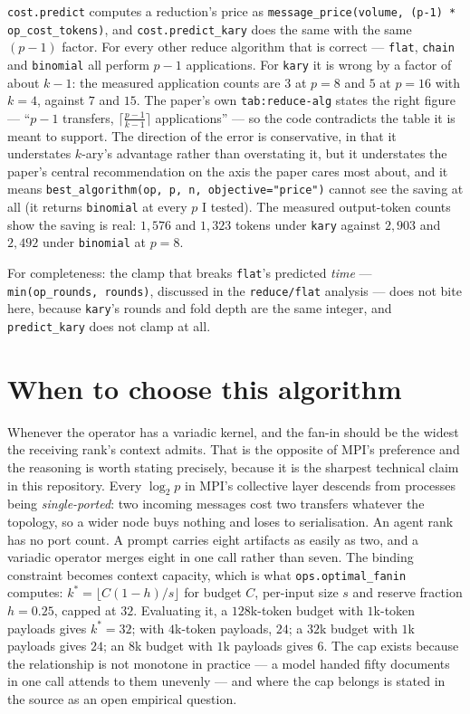 \documentclass[11pt]{article}
\begin{document}
\texttt{cost.predict} computes a reduction's price as
\texttt{message\_price(volume, (p-1) * op\_cost\_tokens)}, and \texttt{cost.predict\_kary} does
the same with the same $(p-1)$ factor. For every other reduce algorithm that is correct ---
\texttt{flat}, \texttt{chain} and \texttt{binomial} all perform $p-1$ applications. For
\texttt{kary} it is wrong by a factor of about $k-1$: the measured application counts are $3$
at $p=8$ and $5$ at $p=16$ with $k=4$, against $7$ and $15$. The paper's own
\texttt{tab:reduce-alg} states the right figure --- ``$p-1$ transfers,
$\lceil\frac{p-1}{k-1}\rceil$ applications'' --- so the code contradicts the table it is meant
to support. The direction of the error is conservative, in that it understates $k$-ary's
advantage rather than overstating it, but it understates the paper's central recommendation on
the axis the paper cares most about, and it means \texttt{best\_algorithm(op, p, n,
objective="price")} cannot see the saving at all (it returns \texttt{binomial} at every $p$ I
tested). The measured output-token counts show the saving is real: $1{,}576$ and $1{,}323$
tokens under \texttt{kary} against $2{,}903$ and $2{,}492$ under \texttt{binomial} at $p=8$.

For completeness: the clamp that breaks \texttt{flat}'s predicted \emph{time} ---
\texttt{min(op\_rounds, rounds)}, discussed in the \texttt{reduce/flat} analysis --- does not
bite here, because \texttt{kary}'s rounds and fold depth are the same integer, and
\texttt{predict\_kary} does not clamp at all.

\section{When to choose this algorithm}

Whenever the operator has a variadic kernel, and the fan-in should be the widest the receiving
rank's context admits. That is the opposite of MPI's preference and the reasoning is worth
stating precisely, because it is the sharpest technical claim in this repository. Every
$\log_2 p$ in MPI's collective layer descends from processes being \emph{single-ported}: two
incoming messages cost two transfers whatever the topology, so a wider node buys nothing and
loses to serialisation. An agent rank has no port count. A prompt carries eight artifacts as
easily as two, and a variadic operator merges eight in one call rather than seven. The binding
constraint becomes context capacity, which is what \texttt{ops.optimal\_fanin} computes:
$k^{*} = \lfloor C(1-h)/s \rfloor$ for budget $C$, per-input size $s$ and reserve fraction
$h = 0.25$, capped at $32$. Evaluating it, a $128$k-token budget with $1$k-token payloads gives
$k^{*} = 32$; with $4$k-token payloads, $24$; a $32$k budget with $1$k payloads gives $24$; an
$8$k budget with $1$k payloads gives $6$. The cap exists because the relationship is not
monotone in practice --- a model handed fifty documents in one call attends to them unevenly ---
and where the cap belongs is stated in the source as an open empirical question.
\end{document}
